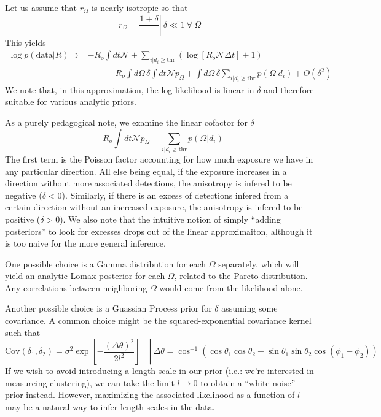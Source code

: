 \documentclass{article}
\begin{document}
Let us assume that $r_\Omega$ is nearly isotropic so that 
\begin{equation}
    \left. r_\Omega = \frac{1+\delta} \ \right| \ \delta \ll 1 \ \forall \ \Omega
\end{equation}
This yields
\begin{align}
    \log p(\mathrm{data}|R) \supset & - R_o \int dt \mathcal{N} + \sum\limits_{i|d_i\geq\mathrm{thr}} \left( \log\left[ R_o \mathcal{N} \Delta t \right] + 1 \right) \\
                                    & \quad \quad - R_o \int d\Omega\, \delta \int dt \mathcal{N} p_\Omega + \int d\Omega\, \delta \sum\limits_{i|d_i\geq\mathrm{thr}} p(\Omega|d_i) + O\left(\delta^2\right)
\end{align}
We note that, in this approximation, the log likelihood is linear in $\delta$ and therefore suitable for various analytic priors. 

As a purely pedagogical note, we examine the linear cofactor for $\delta$
\begin{equation}
    -R_o \int dt \mathcal{N} p_\Omega + \sum\limits_{i|d_i\geq\mathrm{thr}} p(\Omega|d_i)
\end{equation}
The first term is the Poisson factor accounting for how much exposure we have in any particular direction. 
All else being equal, if the exposure increases in a direction without more associated detections, the anisotropy is infered to be negative ($\delta < 0$). 
Similarly, if there is an excess of detections infered from a certain direction without an increased exposure, the anisotropy is infered to be positive ($\delta > 0$).
We also note that the intuitive notion of simply ``adding posteriors'' to look for excesses drops out of the linear approximaiton, although it is too naive for the more general inference.

One possible choice is a Gamma distribution for each $\Omega$ separately, which will yield an analytic Lomax posterior for each $\Omega$, related to the Pareto distribution.
Any correlations between neighboring $\Omega$ would come from the likelihood alone.

Another possible choice is a Guassian Process prior for $\delta$ assuming some covariance. 
A common choice might be the squared-exponential covariance kernel such that
\begin{equation}
    \left. \text{Cov}(\delta_1, \delta_2) = \sigma^2 \exp \left[ -\frac{\left(\Delta \theta\right)^2}{2l^2}\right] \quad  \right| \ \Delta \theta = \cos^{-1}\left(\cos\theta_1\cos\theta_2 + \sin\theta_1\sin\theta_2\cos(\phi_1-\phi_2)\right)
\end{equation}
If we wish to avoid introducing a length scale in our prior (i.e.: we're interested in measureing clustering), we can take the limit $l \rightarrow 0$ to obtain a ``white noise'' prior instead.
However, maximizing the associated likelihood as a function of $l$ may be a natural way to infer length scales in the data.
\end{document}
